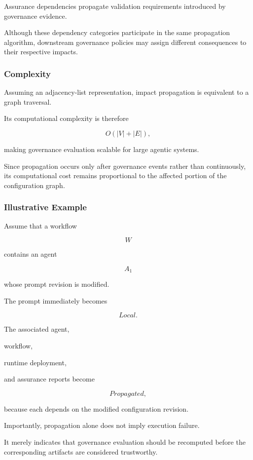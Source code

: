 \documentclass[10pt]{article}
\begin{document}
Assurance dependencies propagate validation requirements introduced by
governance evidence.

Although these dependency categories participate in the same propagation
algorithm, downstream governance policies may assign different consequences to
their respective impacts.

\subsubsection{Complexity}

Assuming an adjacency-list representation, impact propagation is equivalent to
a graph traversal.

Its computational complexity is therefore

\[
O(|V|+|E|),
\]

making governance evaluation scalable for large agentic systems.

Since propagation occurs only after governance events rather than continuously,
its computational cost remains proportional to the affected portion of the
configuration graph.

\subsubsection{Illustrative Example}

Assume that a workflow

\[
W
\]

contains an agent

\[
A_1
\]

whose prompt revision is modified.

The prompt immediately becomes

\[
Local.
\]

The associated agent,

workflow,

runtime deployment,

and assurance reports become

\[
Propagated,
\]

because each depends on the modified configuration revision.

Importantly, propagation alone does not imply execution failure.

It merely indicates that governance evaluation should be recomputed before the
corresponding artifacts are considered trustworthy.
\end{document}
